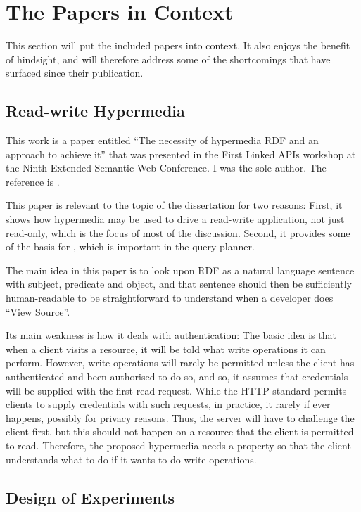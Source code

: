 \section{The Papers in Context}\label{sec:papersincontext}

This section will put the included papers into context. It also enjoys
the benefit of hindsight, and will therefore address some of the
shortcomings that have surfaced since their publication.

\subsection{Read-write Hypermedia}\label{sec:conlapis}

This work is a paper entitled ``The necessity of hypermedia RDF and an
approach to achieve it'' that was presented in the First Linked APIs
workshop at the Ninth Extended Semantic Web Conference. I was the sole
author. The reference is \cite{kjernsmo_lapis_2012}.

This paper is relevant to the topic of the dissertation for two
reasons: First, it shows how hypermedia may be used to drive a
read-write application, not just read-only, which is the focus of most
of the discussion. Second, it provides some of the basis for
\cite{ldf1}, which is important in the query planner.

The main idea in this paper is to look upon RDF as a natural language
sentence with subject, predicate and object, and that sentence should
then be sufficiently human-readable to be straightforward to
understand when a developer does ``View Source''.

Its main weakness is how it deals with authentication: The basic idea
is that when a client visits a resource, it will be told what
write operations it can perform. However, write operations will rarely
be permitted unless the client has authenticated and been authorised
to do so, and so, it assumes that credentials will be supplied with
the first read request. While the HTTP standard permits clients to
supply credentials with such requests, in practice, it rarely if ever
happens, possibly for privacy reasons. Thus, the server will have to
challenge the client first, but this should not happen on a resource
that the client is permitted to read. Therefore, the proposed hypermedia
needs a property so that the client understands what to do if it wants
to do write operations.

\subsection{Design of Experiments}\label{sec:condoe}

